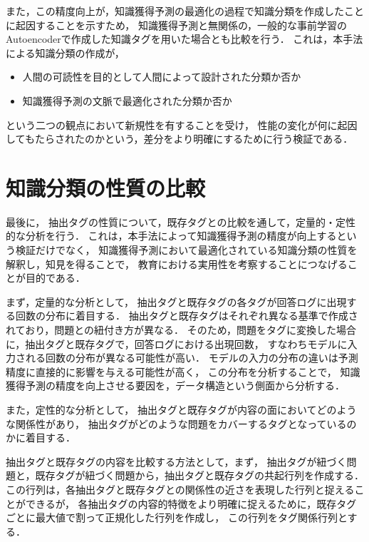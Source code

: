 また，この精度向上が，知識獲得予測の最適化の過程で知識分類を作成したことに起因することを示すため，
知識獲得予測と無関係の，一般的な事前学習のAutoencoderで作成した知識タグを用いた場合とも比較を行う．
これは，本手法による知識分類の作成が，
\begin{itemize}
	\item 人間の可読性を目的として人間によって設計された分類か否か
	\item 知識獲得予測の文脈で最適化された分類か否か
\end{itemize}
という二つの観点において新規性を有することを受け，
性能の変化が何に起因してもたらされたのかという，差分をより明確にするために行う検証である．




\section{知識分類の性質の比較}
最後に，
抽出タグの性質について，既存タグとの比較を通して，定量的・定性的な分析を行う．
これは，本手法によって知識獲得予測の精度が向上するという検証だけでなく，
知識獲得予測において最適化されている知識分類の性質を解釈し，知見を得ることで，
教育における実用性を考察することにつなげることが目的である．

まず，定量的な分析として，
抽出タグと既存タグの各タグが回答ログに出現する回数の分布に着目する．
抽出タグと既存タグはそれぞれ異なる基準で作成されており，問題との紐付き方が異なる．
そのため，問題をタグに変換した場合に，抽出タグと既存タグで，回答ログにおける出現回数，
すなわちモデルに入力される回数の分布が異なる可能性が高い．
モデルの入力の分布の違いは予測精度に直接的に影響を与える可能性が高く，
この分布を分析することで，
知識獲得予測の精度を向上させる要因を，データ構造という側面から分析する．

また，定性的な分析として，
抽出タグと既存タグが内容の面においてどのような関係性があり，
抽出タグがどのような問題をカバーするタグとなっているのかに着目する．

抽出タグと既存タグの内容を比較する方法として，まず，
抽出タグが紐づく問題と，既存タグが紐づく問題から，抽出タグと既存タグの共起行列を作成する．
この行列は，各抽出タグと既存タグとの関係性の近さを表現した行列と捉えることができるが，
各抽出タグの内容的特徴をより明確に捉えるために，既存タグごとに最大値で割って正規化した行列を作成し，
この行列をタグ関係行列とする．

